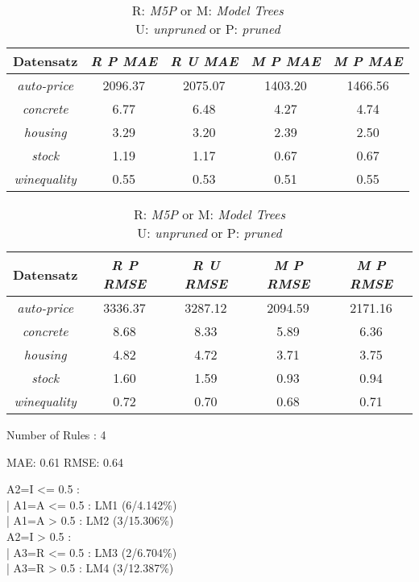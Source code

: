 
\begin{table}
\begin{tabular}{c|c|c|c|c}
Datensatz  & \emph{R P MAE } & \emph{R U MAE} & \emph{M P MAE} & \emph{M P MAE} \\ \hline
\emph{auto-price}  & 2096.37 & 2075.07& 1403.20 & 1466.56 \\ \hline
\emph{concrete}    & 6.77    & 6.48   & 4.27    & 4.74     \\ \hline
\emph{housing}     & 3.29    & 3.20   & 2.39    & 2.50     \\ \hline
\emph{stock}       & 1.19    & 1.17   & 0.67    & 0.67     \\ \hline
\emph{winequality} & 0.55    & 0.53   & 0.51    & 0.55       
\end{tabular}
\caption{R: \emph{M5P} or M: \emph{Model Trees} \\
 U: \emph{unpruned} or P: \emph{pruned}}
\end{table}



\begin{table}
\begin{tabular}{c|c|c|c|c}
Datensatz  & \emph{R P RMSE} & \emph{R U RMSE} & \emph{M P RMSE} & \emph{M P RMSE} \\ \hline
\emph{auto-price}  & 3336.37  & 3287.12 & 2094.59 & 2171.16 \\ \hline
\emph{concrete}    & 8.68 & 8.33 & 5.89 & 6.36 \\ \hline
\emph{housing}     & 4.82 & 4.72 & 3.71 & 3.75 \\ \hline
\emph{stock}       & 1.60 & 1.59 & 0.93 & 0.94 \\ \hline
\emph{winequality} & 0.72 & 0.70 & 0.68 & 0.71   
\end{tabular}
\caption{R: \emph{M5P} or M: \emph{Model Trees} \\
 U: \emph{unpruned} or P: \emph{pruned} }
\end{table}



Number of Rules : 4

MAE: 0.61 
RMSE: 0.64



A2=I <= 0.5 : \\
|   A1=A <= 0.5 : LM1 (6/4.142\%) \\
|   A1=A >  0.5 : LM2 (3/15.306\%)\\
A2=I >  0.5 :  \\
|   A3=R <= 0.5 : LM3 (2/6.704\%) \\
|   A3=R >  0.5 : LM4 (3/12.387\%) \\
